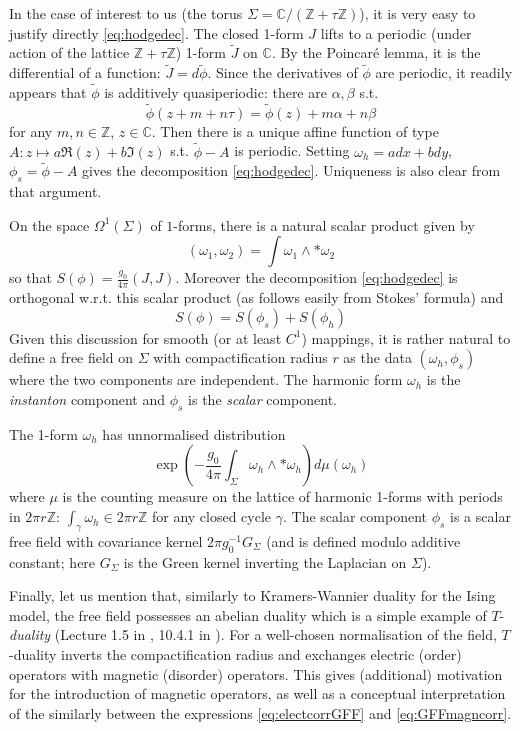 \documentclass[10pt]{article}
\newcommand{\Z}{\mathbb{Z}}
\newcommand{\C}{\mathbb{C}}
\begin{document}
In the case of interest to us (the torus $\Sigma=\C/(\Z+\tau\Z)$), it is very easy to justify directly \eqref{eq:hodgedec}. The closed 1-form $J$ lifts to a periodic (under action of the lattice $\Z+\tau\Z$) 1-form $\tilde J$ on $\C$. By the Poincar\'e lemma, it is the differential of a function: $\tilde J=d\tilde\phi$. Since the derivatives of $\tilde\phi$ are periodic, it readily appears that $\tilde\phi$ is additively quasiperiodic: there are $\alpha,\beta$ s.t.
$$\tilde\phi(z+m+n\tau)=\tilde\phi(z)+m\alpha+n\beta$$
for any $m,n\in\Z$, $z\in\C$. Then there is a unique affine function of type $A:z\mapsto a\Re(z)+b\Im(z)$ s.t.
$\tilde\phi-A$ is periodic. Setting $\omega_h=adx+bdy$, $\phi_s=\tilde\phi-A$ gives the decomposition \eqref{eq:hodgedec}. Uniqueness is also clear from that argument.


On the space $\Omega^1(\Sigma)$ of $1$-forms, there is a natural scalar product given by
$$(\omega_1,\omega_2)=\int \omega_1\wedge\ast\omega_2$$
so that $S(\phi)=\frac{g_0}{4\pi}(J,J)$. Moreover the decomposition \eqref{eq:hodgedec} is orthogonal w.r.t. this scalar product (as follows easily from Stokes' formula) and
$$S(\phi)=S(\phi_s)+S(\phi_h)$$
%
%
%
Given this discussion for smooth (or at least $C^1$) mappings, it is rather natural to define a free field on $\Sigma$ with compactification radius $r$ as the data $(\omega_h,\phi_s)$ where the two components are independent. The harmonic form $\omega_h$  is the {\em instanton} component and $\phi_s$ is the {\em scalar} component.

The 1-form $\omega_h$ has unnormalised distribution
$$\exp(-\frac{g_0}{4\pi}\int_\Sigma\omega_h\wedge\ast\omega_h)d\mu(\omega_h)$$
where $\mu$ is the counting measure on the lattice of harmonic 1-forms with periods in $2\pi r\Z$: $\int_\gamma\omega_h\in 2\pi r\Z$ for any closed cycle $\gamma$. The scalar component $\phi_s$ is a scalar free field with covariance kernel $2\pi g_0^{-1}G_\Sigma$ (and is defined modulo additive constant; here $G_\Sigma$ is the Green kernel inverting the Laplacian on $\Sigma$).

Finally, let us mention that, similarly to Kramers-Wannier duality for the Ising model, the free field possesses an abelian duality which is a simple example of $T$-{\em duality} (Lecture 1.5 in \cite {Gaw_CFT}, 10.4.1 in \cite{DiF}). For a well-chosen normalisation of the field, $T$-duality inverts the compactification radius and exchanges electric (order) operators with magnetic (disorder) operators. This gives (additional) motivation for the introduction of magnetic operators, as well as a conceptual interpretation of the similarly between the expressions \eqref{eq:electcorrGFF} and \eqref{eq:GFFmagncorr}.
\end{document}
